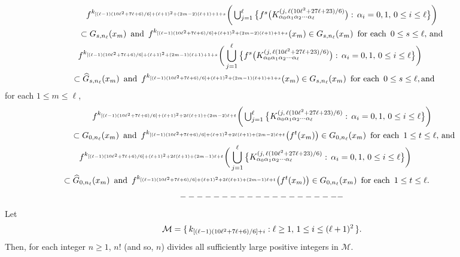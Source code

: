 \documentclass[12pt]{article}
\newcommand{\al}{\alpha}
\begin{document}
\begin{multline*}
$$
f^{k_{[(\ell-1)(10\ell^2+7\ell+6)/6]+(\ell+1)^2+(2m-2)(\ell+1)+1+s}}\bigg(\bigcup_{j=1}^\ell \big\{ f^s\big(K_{\al_0\al_1\al_2\cdots\al_\ell}^{(j, \, \ell(10\ell^2+27\ell+23)/6)}\big): \, \al_i = 0, 1, \, 0 \le i \le \ell \big\}\bigg) \\ 
\subset G_{s,n_\ell}(x_m) \,\,\, \text{and} \,\,\, f^{k_{[(\ell-1)(10\ell^2+7\ell+6)/6]+(\ell+1)^2+(2m-2)(\ell+1)+1+s}}(x_m) \in G_{s,n_\ell}(x_m) \,\,\, \text{for each} \,\,\, 0 \le s \le \ell, \, \text{and} \\
\,\,\,\,\, f^{k_{[(\ell-1)(10\ell^2+7\ell+6)/6]+(\ell+1)^2+(2m-1)(\ell+1)+1+s}}\bigg(\bigcup_{j=1}^\ell \big\{f^s\big(K_{\al_0\al_1\al_2\cdots\al_\ell}^{(j, \, \ell(10\ell^2+27\ell+23)/6)}\big): \, \al_i = 0, 1, \, 0 \le i \le \ell \big\}\bigg) \qquad\quad\,\,\,\, \\ 
\quad\,\, \subset \widehat G_{s,n_\ell}(x_m) \,\,\, \text{and} \,\,\, f^{k_{[(\ell-1)(10\ell^2+7\ell+6)/6]+(\ell+1)^2+(2m-1)(\ell+1)+1+s}}(x_m) \in G_{s,n_\ell}(x_m) \,\,\, \text{for each} \,\,\, 0 \le s \le \ell, \text{and} \quad\quad\quad\,
$$
\end{multline*}
for each $1 \le m \le \ell$, 
\begin{multline*}
$$
f^{k_{[(\ell-1)(10\ell^2+7\ell+6)/6]+(\ell+1)^2+2\ell(\ell+1)+(2m-2)\ell+t}}\bigg(\bigcup_{j=1}^\ell \big\{ K_{\al_0\al_1\al_2\cdots\al_\ell}^{(j, \,\ell(10\ell^2+27\ell+23)/6)}: \, \al_i = 0, 1, \, 0 \le i \le \ell \big\}\bigg) \\ 
\,\,\, \subset G_{0,n_\ell}(x_m) \,\,\, \text{and} \,\,\, f^{k_{[(\ell-1)(10\ell^2+7\ell+6)/6]+(\ell+1)^2+2\ell(\ell+1)+(2m-2)\ell+t}}\big(f^{t}(x_m)\big) \in G_{0,n_\ell}(x_m) \,\,\, \text{for each} \,\,\, 1 \le t \le \ell, \, \text{and} \\
\,\,\,\,\, f^{k_{[(\ell-1)(10\ell^2+7\ell+6)/6]+(\ell+1)^2+2\ell(\ell+1)+(2m-1)\ell+t}}\bigg(\bigcup_{j=1}^\ell \big\{ K_{\al_0\al_1\al_2\cdots\al_\ell}^{(j, \,\ell(10\ell^2+27\ell+23)/6)}: \, \al_i = 0, 1, \, 0 \le i \le \ell \big\}\bigg) \qquad\qquad\,\,\,\,\, \\ 
\,\,\, \subset \widehat G_{0,n_\ell}(x_m) \,\,\, \text{and} \,\,\, f^{k_{[(\ell-1)(10\ell^2+7\ell+6)/6]+(\ell+1)^2+2\ell(\ell+1)+(2m-1)\ell+t}}\big(f^{t}(x_m)\big) \in G_{0,n_\ell}(x_m) \,\,\, \text{for each} \,\,\, 1 \le t \le \ell.\qquad\qquad\,
$$
\end{multline*}
$$--------------------\vspace{.1in}$$
\indent Let
$$
\mathcal M = \{ \, k_{[(\ell-1)(10\ell^2+7\ell+6)/6]+i}: \ell \ge 1, \, 1 \le i \le (\ell+1)^2 \, \}.\vspace{.1in}
$$
Then, for each integer $n \ge 1$, $n !$ (and so, $n$) divides all sufficiently large positive integers in $\mathcal M$.  
\end{document}
